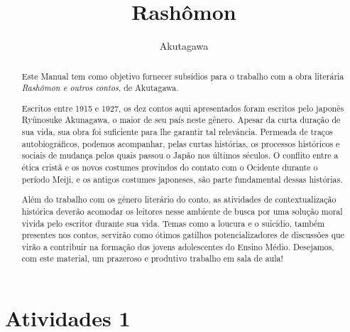 \documentclass[12pt]{extarticle}
\begin{document}
\newcommand{\AutorLivro}{Akutagawa}
\newcommand{\TituloLivro}{Rashômon}
\newcommand{\Tema}{Ficção, mistério e fantasia}
\newcommand{\Genero}{Conto, crônica e novela}
\newcommand{\imagemCapa}{./images/PNLD0009-01.png}
\newcommand{\issnppub}{---}
\newcommand{\issnepub}{---}
\newcommand{\colaborador}{\textbf{Cesar Augusto Araujo Oyakawa, Bruno Gradella e Vicente Castro} é uma pessoa incrível e vai fazer um bom serviço.}


\title{\TituloLivro}
\author{\AutorLivro}
\def\authornotes{\colaborador}

\date{}
\maketitle

\baselineskip\par

\begin{abstract}
Este Manual tem como objetivo fornecer subsídios para o trabalho com a
obra literária \emph{Rashômon e outros contos}, de Akutagawa.

Escritos entre 1915 e 1927, os dez contos aqui apresentados foram escritos 
pelo japonês Ryûnosuke Akunagawa, o maior de seu país neste gênero. Apesar 
da curta duração de sua vida, sua obra foi suficiente para lhe garantir tal 
relevância. Permeada de traços autobiográficos, podemos acompanhar, pelas 
curtas histórias, os processos históricos e sociais de mudança pelos quais 
passou o Japão nos últimos séculos. O conflito entre a ética cristã e os 
novos costumes provindos do contato com o Ocidente durante o período Meiji, 
e os antigos costumes japoneses, são parte fundamental dessas histórias. 

Além do trabalho com os gênero literário do conto, as atividades de 
contextualização histórica deverão acomodar os leitores nesse ambiente de 
busca por uma solução moral vivida pelo escritor durante sua vida. 
Temas como a loucura e o suicídio, também presentes nos contos, servirão 
como ótimos gatilhos potencializadores de discussões que virão a contribuir 
na formação dos jovens adolescentes do Ensino Médio. 
Desejamos, com este material, um prazeroso e produtivo trabalho em sala de aula!

\end{abstract}

\tableofcontents


\section{Atividades 1}
\end{document}

